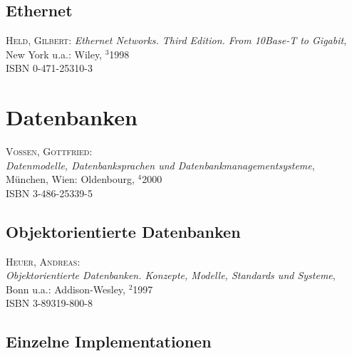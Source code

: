 
\subsection{Ethernet}

\begin{description}
  
\item \textsc{Held, Gilbert}: \textit{Ethernet Networks.  Third
    Edition. From 10Base-T to Gigabit}, New York u.a.:
  Wiley, $^3$1998 \\
  ISBN 0-471-25310-3

\end{description}


\section{Datenbanken}

\begin{description}
  

\item \textsc{Vossen, Gottfried}: \\
  \textit{Datenmodelle, Datenbanksprachen und Datenbankmanagementsysteme}, \\
  M\"unchen, Wien: Oldenbourg, $^4$2000 \\
  ISBN 3-486-25339-5

\end{description}

\subsection{Objektorientierte Datenbanken}

\begin{description}  

\item \textsc{Heuer, Andreas}: \\
  \textit{Objektorientierte Datenbanken. Konzepte, Modelle, Standards und Systeme}, \\
  Bonn u.a.: Addison-Wesley, $^2$1997 \\
  ISBN 3-89319-800-8

\end{description}

\subsection{Einzelne Implementationen}

